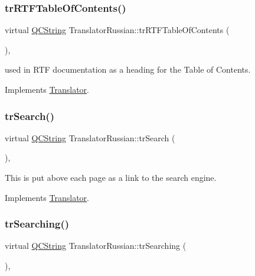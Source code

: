 \subsubsection{\texorpdfstring{trRTFTableOfContents()}{trRTFTableOfContents()}}
{\footnotesize\ttfamily virtual \mbox{\hyperlink{class_q_c_string}{Q\+C\+String}} Translator\+Russian\+::tr\+R\+T\+F\+Table\+Of\+Contents (\begin{DoxyParamCaption}{ }\end{DoxyParamCaption})\hspace{0.3cm}{\ttfamily [inline]}, {\ttfamily [virtual]}}

used in R\+TF documentation as a heading for the Table of Contents. 

Implements \mbox{\hyperlink{class_translator}{Translator}}.

\mbox{\label{class_translator_russian_a3afca6623fa568fd6434608272a0b2e3}} 
\subsubsection{\texorpdfstring{trSearch()}{trSearch()}}
{\footnotesize\ttfamily virtual \mbox{\hyperlink{class_q_c_string}{Q\+C\+String}} Translator\+Russian\+::tr\+Search (\begin{DoxyParamCaption}{ }\end{DoxyParamCaption})\hspace{0.3cm}{\ttfamily [inline]}, {\ttfamily [virtual]}}

This is put above each page as a link to the search engine. 

Implements \mbox{\hyperlink{class_translator}{Translator}}.

\mbox{\label{class_translator_russian_a0e4f0c8f07a85ee9d1184626d4bb60db}} 
\subsubsection{\texorpdfstring{trSearching()}{trSearching()}}
{\footnotesize\ttfamily virtual \mbox{\hyperlink{class_q_c_string}{Q\+C\+String}} Translator\+Russian\+::tr\+Searching (\begin{DoxyParamCaption}{ }\end{DoxyParamCaption})\hspace{0.3cm}{\ttfamily [inline]}, {\ttfamily [virtual]}}

